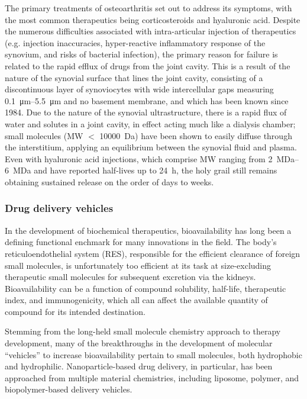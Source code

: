\begin{refsection}
The primary treatments of osteoarthritis set out to address its symptoms, with
the most common therapeutics being corticosteroids and hyaluronic
acid.\cite{Butoescu2009} Despite the numerous difficulties associated with
intra-articular injection of therapeutics (e.g. injection inaccuracies,
hyper-reactive inflammatory response of the synovium, and risks of bacterial
infection), the primary reason for failure is related to the rapid efflux of
drugs from the joint cavity.\cite{Ayral2001} This is a result of the
nature of the synovial surface that lines the joint cavity, consisting of a
discontinuous layer of synoviocytes with wide intercellular gaps measuring
\SIrange{0.1}{5.5}{\um} and no basement membrane, and which has been known since
1984.\cite{Knight1984} Due to the nature of the synovial ultrastructure, there
is a rapid flux of water and solutes in a joint cavity, in effect acting 
much like a dialysis chamber; small molecules (MW ${<}$ \SI{10000}{\dalton}) have
been shown to easily diffuse through the interstitium, applying an equilibrium
between the synovial fluid and plasma.\cite{Gerwin2006,Okuyama1984} Even with
hyaluronic acid injections, which comprise MW ranging from
\SIrange{2}{6}{\mega\dalton} and have reported half-lives up to \SI{24}{\hour},
the holy grail still remains obtaining sustained release on the order of days to
weeks.

\subsubsection{Drug delivery vehicles}

In the development of biochemical therapeutics, bioavailability has long been a
defining functional enchmark for many innovations in the field. The body's
reticuloendothelial system (RES), responsible for the efficient clearance of foreign
small molecules, is unfortunately too efficient at its task at size-excluding
therapeutic small molecules for subsequent excretion via the kidneys.
Bioavailability can be a function of compound solubility, 
half-life, therapeutic index, and immunogenicity, which all can affect the
available quantity of compound for its intended
destination.\cite{Petros2010,Davis2008,Shah1992}

Stemming from the long-held small molecule chemistry approach to therapy development,
many of the breakthroughs in the development of molecular ``vehicles'' to
increase bioavailability pertain to small molecules, both hydrophobic and
hydrophilic.\cite{Branco2009} Nanoparticle-based drug delivery, in particular, has been
approached from multiple material chemistries, including liposome, polymer, and
biopolymer-based delivery
vehicles.\cite{Branco2009,Iyer2006,Park2010,McDaniel2010}


\end{refsection}
